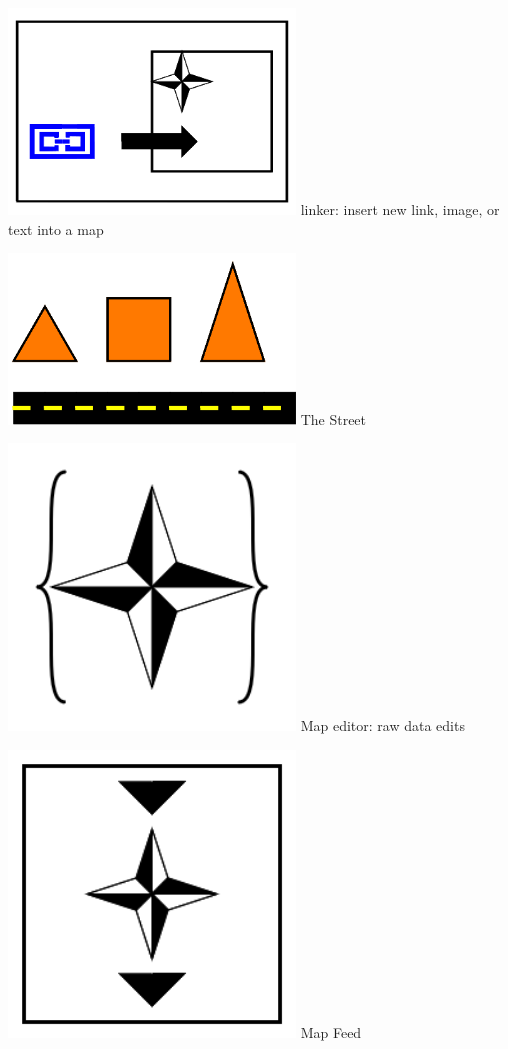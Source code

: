 \documentclass[11pt]{article}
\begin{document}
\includegraphics[width=3in]{image9.png}
linker: insert new link, image, or text into a map

\includegraphics[width=3in]{image10.png}
The Street

\includegraphics[width=3in]{image11.png}
Map editor: raw data edits

\includegraphics[width=3in]{image12.png}
Map Feed
\end{document}

